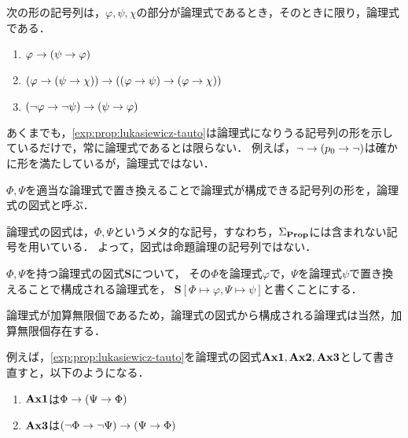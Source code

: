 \begin{myExample}
  \label{exp:prop:lukasiewicz-tauto}
  次の形の記号列は，$\varphi,\psi,\chi$の部分が論理式であるとき，そのときに限り，論理式である．
  \begin{enumerate}
    \item $\varphi \limp (\psi \limp \varphi)$
    \item $(\varphi \limp (\psi \limp \chi)) \limp ((\varphi \limp \psi) \limp (\varphi \limp \chi))$
    \item $(\lnot \varphi \limp \lnot \psi) \limp (\psi \limp \varphi)$
  \end{enumerate}
\end{myExample}

\begin{myRemark}
  あくまでも，\ref*{exp:prop:lukasiewicz-tauto}は論理式になりうる記号列の形を示しているだけで，常に論理式であるとは限らない．
  例えば，$\lnot \limp (p_0 \limp \lnot)$は確かに形を満たしているが，論理式ではない．
\end{myRemark}

\begin{myDefinition}[論理式の図式]
  $\Phi,\Psi$を適当な論理式で置き換えることで論理式が構成できる記号列の形を，論理式の図式と呼ぶ．
\end{myDefinition}

\begin{myRemark}
  論理式の図式は，$\Phi,\Psi$というメタ的な記号，すなわち，$\PropAlphabet$には含まれない記号を用いている．
  よって，図式は命題論理の記号列ではない．
\end{myRemark}

\begin{myDefinition}[図式からの論理式の生成]
  $\Phi,\Psi$を持つ論理式の図式$\mathbf{S}$について，
  その$\Phi$を論理式$\varphi$で，$\Psi$を論理式$\psi$で置き換えることで構成される論理式を，
  $\mathbf{S}\left[\Phi \mapsto \varphi, \Psi \mapsto \psi\right]$と書くことにする．
\end{myDefinition}

\begin{myRemark}
  論理式が加算無限個であるため，論理式の図式から構成される論理式は当然，加算無限個存在する．
\end{myRemark}

\begin{myExample}
  \label{exp:prop:lukasiewicz-tauto-schema}
  例えば，\ref*{exp:prop:lukasiewicz-tauto}を論理式の図式$\AxiomSchema[1],\AxiomSchema[2],\AxiomSchema[3]$として書き直すと，以下のようになる．
  \begin{enumerate}
    \item $\AxiomSchema[1]$は$\Phi \limp (\Psi \limp \Phi)$
    \item $\AxiomSchema[3]$は$(\lnot \Phi \limp \lnot \Psi) \limp (\Psi \limp \Phi)$
  \end{enumerate}
\end{myExample}

